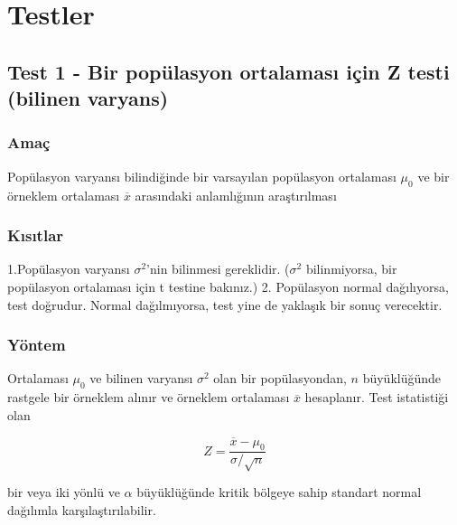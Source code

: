\documentclass[
  12pt,
]{book}
\begin{document}
\hypertarget{tests}{%
\chapter{Testler}\label{tests}}

\hypertarget{test-1---bir-popuxfclasyon-ortalamasux131-iuxe7in-z-testi-bilinen-varyans}{%
\section{Test 1 - Bir popülasyon ortalaması için Z testi (bilinen varyans)}\label{test-1---bir-popuxfclasyon-ortalamasux131-iuxe7in-z-testi-bilinen-varyans}}

\hypertarget{amauxe7}{%
\subsection{Amaç}\label{amauxe7}}

Popülasyon varyansı bilindiğinde bir varsayılan popülasyon ortalaması \(\mu_{0}\) ve bir örneklem ortalaması \(\overline{x}\) arasındaki anlamlığının araştırılması

\hypertarget{kux131sux131tlar}{%
\subsection{Kısıtlar}\label{kux131sux131tlar}}

1.Popülasyon varyansı \(\sigma^{2}\)'nin bilinmesi gereklidir. (\(\sigma^{2}\) bilinmiyorsa, bir popülasyon ortalaması için t testine bakınız.)
2. Popülasyon normal dağılıyorsa, test doğrudur. Normal dağılmıyorsa, test yine de yaklaşık bir sonuç verecektir.

\hypertarget{yuxf6ntem}{%
\subsection{Yöntem}\label{yuxf6ntem}}

Ortalaması \(\mu_{0}\) ve bilinen varyansı \(\sigma^{2}\) olan bir popülasyondan, \(n\) büyüklüğünde rastgele bir örneklem alınır ve örneklem ortalaması \(\overline{x}\) hesaplanır. Test istatistiği olan

\begin{equation}
Z = \frac{\overline{x} - \mu_{0}}{\sigma / \sqrt{n}}
\end{equation}

bir veya iki yönlü ve \(\alpha\) büyüklüğünde kritik bölgeye sahip standart normal dağılımla karşılaştırılabilir.
\end{document}
